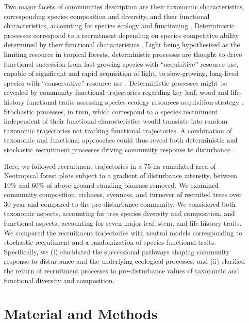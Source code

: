 \documentclass[fleqn,10pt]{ArtEcoFoG} %
\begin{document}
Two major facets of communities description are their taxonomic characteristics, corresponding species composition and diversity, and their functional characteristics, accounting for species ecology and functioning \citep{Macarthur1967, Violle2007b, Kunstler2016}.
Deterministic processes correspond to a recruitment depending on species competitive ability determined by their functional characteristics \citep{Rees2001, Perronne2017}.
Light being hypothesised as the limiting resource in tropical forests, deterministic processes are thought to drive functional succession from fast-growing species with ``acquisitive'' resource use, capable of significant and rapid acquisition of light, to slow-growing, long-lived species with ``conservative'' resource use \citep{Denslow1980, Molino2001, Bongers2009}.
Deterministic processes might be revealed by community functional trajectories regarding key leaf, wood and life-history functional traits assessing species ecology resources acquisition strategy \citep{Wright2004, Chave2009b, Herault2011}.
Stochastic processes, in turn, which correspond to a species recruitment independent of their functional characteristics would translate into random taxonomic trajectories not tracking functional trajectories.
A combination of taxonomic and functional approaches could thus reveal both deterministic and stochastic recruitment processes driving community response to disturbance \citep{Fukami2005, Chalmandrier2015, Cequinel2018}.

Here, we followed recruitment trajectories in a 75-ha cumulated area of Neotropical forest plots subject to a gradient of disturbance intensity, between 10\% and 60\% of above-ground standing biomass removed. We examined community composition, richness, evenness, and turnover of recruited trees over 30-year and compared to the pre-disturbance community. We considered both taxonomic aspects, accounting for tree species diversity and composition, and functional aspects, accounting for seven major leaf, stem, and life-history traits. We compared the recruitment trajectories with neutral models corresponding to stochastic recruitment and a randomization of species functional traits. Specifically, we (i) elucidated the successional pathways shaping community response to disturbance and the underlying ecological processes, and (ii) clarified the return of recruitment processes to pre-disturbance values of taxonomic and functional diversity and composition.

\hypertarget{material-and-methods}{%
\section{Material and Methods}\label{material-and-methods}}
\end{document}
